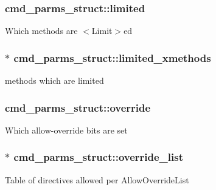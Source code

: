 \subsubsection[{\texorpdfstring{limited}{limited}}]{ cmd\+\_\+parms\+\_\+struct\+::limited}\hypertarget{structcmd__parms__struct_a59b58d3611181b060e135acc4d856c48}{}\label{structcmd__parms__struct_a59b58d3611181b060e135acc4d856c48}
Which methods are $<$Limit$>$ed 
\subsubsection[{\texorpdfstring{limited\+\_\+xmethods}{limited_xmethods}}]{$\ast$ cmd\+\_\+parms\+\_\+struct\+::limited\+\_\+xmethods}\hypertarget{structcmd__parms__struct_ab5e77274ea5f65235ec6a6327a3a2845}{}\label{structcmd__parms__struct_ab5e77274ea5f65235ec6a6327a3a2845}
methods which are limited 
\subsubsection[{\texorpdfstring{override}{override}}]{ cmd\+\_\+parms\+\_\+struct\+::override}\hypertarget{structcmd__parms__struct_a10a6c1afe5768900849f047c9e9db55e}{}\label{structcmd__parms__struct_a10a6c1afe5768900849f047c9e9db55e}
Which allow-\/override bits are set 
\subsubsection[{\texorpdfstring{override\+\_\+list}{override_list}}]{$\ast$ cmd\+\_\+parms\+\_\+struct\+::override\+\_\+list}\hypertarget{structcmd__parms__struct_a59a43d91a92b0c15afc26c0554498b3e}{}\label{structcmd__parms__struct_a59a43d91a92b0c15afc26c0554498b3e}
Table of directives allowed per Allow\+Override\+List 
